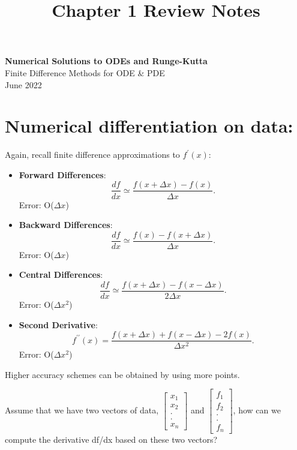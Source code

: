\documentclass[11pt]{article}
\theoremstyle{definition}
\begin{document}
\setcounter{section}{0}
\title{Chapter 1 Review Notes}

\thispagestyle{empty}

\begin{center}
{\LARGE \bf Numerical Solutions to ODEs and Runge-Kutta}\\

{\large Finite Difference Methods for ODE \& PDE}\\
June 2022
\end{center}

\section{Numerical differentiation on data:}

Again, recall finite difference approximations to $f^\prime(x)$:

\begin{itemize}
 \item {\bf Forward Differences}:
  \begin{equation}
  \frac{df}{dx} \simeq  \frac{f(x+\Delta x)-f(x)}{\Delta x}.
 \end{equation}
Error: O($\Delta x$)
 \item {\bf Backward Differences}:
 \begin{equation}
  \frac{df}{dx} \simeq  \frac{f(x)-f(x + \Delta x)}{\Delta x}.
 \end{equation}
Error: O($\Delta x$)
 \item {\bf Central Differences}:
 \begin{equation}
  \frac{df}{dx} \simeq  \frac{f(x+ \Delta x)-f(x - \Delta x)}{2\Delta x}.
 \end{equation}
Error: O($\Delta x^2$)
 \item {\bf Second Derivative}:
 \begin{equation}
 f^{\prime\prime}(x)=\frac{f(x+\Delta x)+f(x-\Delta x)-2f(x)}{\Delta x^2}.
\end{equation}
Error: O($\Delta x^2$)
\end{itemize}

Higher accuracy schemes can be obtained by using more points.

Assume that we have two vectors of data, $\begin{bmatrix}
x_1 \\
x_2 \\
. \\
. \\
x_n
\end{bmatrix}$ and $\begin{bmatrix}
f_1 \\
f_2 \\
. \\
. \\
f_n
\end{bmatrix}$, how can we compute the derivative df/dx based on these two vectors?
\end{document}
